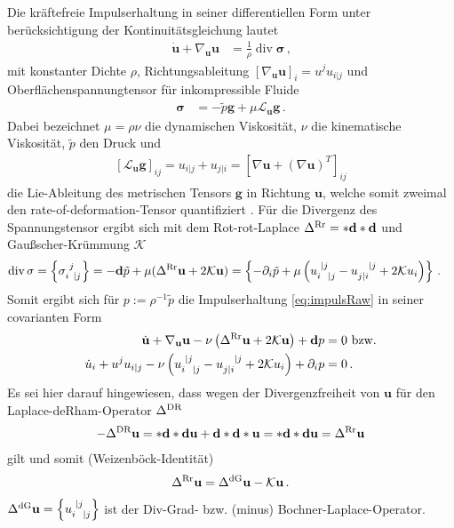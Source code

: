\documentclass[a4paper,11pt]{scrartcl}
\newcommand{\U}{u} %
\newcommand{\Ub}{\mathbf{\U}} %
\renewcommand{\P}{p} %
\newcommand{\g}{\mathbf{g}} %
\newcommand{\gauss}{\mathcal{K}} %
\renewcommand{\div}{\operatorname{div}} %
\newcommand{\lie}{\mathcal{L}} %
\newcommand{\exd}{\mathbf{d}} %
\newcommand{\lrr}{\Delta^{\textup{Rr}}} %
\newcommand{\ldg}{\Delta^{\textup{dG}}} %
\newcommand{\ldr}{\Delta^{\textup{DR}}} %
\newcommand{\formComma}{\,\text{,}}
\newcommand{\formPeriod}{\,\text{.}}
\begin{document}
Die kräftefreie Impulserhaltung in seiner differentiellen Form unter berücksichtigung der Kontinuitätsgleichung lautet \cite{deSimone2009}
\begin{align}\label{eq:impulsRaw}
   \dot{\Ub} + \nabla_{\Ub}\Ub &= \frac{1}{\rho}\div\mathbf{\sigma}\formComma
\end{align}
mit konstanter Dichte \( \rho \), Richtungsableitung \( \left[ \nabla_{\Ub}\Ub \right]_{i} = \U^{j}\U_{i|j} \)
und Oberflächenspannungtensor für inkompressible Fluide
\begin{align}
  \mathbf{\sigma} &= -\tilde{\P}\g + \mu\lie_{\Ub}\g\formPeriod
\end{align}
Dabei bezeichnet \( \mu = \rho\nu \) die dynamischen Viskosität, \( \nu \) die kinematische Viskosität,
\( \tilde{\P} \) den Druck und 
\begin{align}
  \left[ \lie_{\Ub}\g \right]_{ij} = \U_{i|j} + \U_{j|i} = \left[ \nabla\Ub + (\nabla\Ub)^{T} \right]_{ij}
\end{align}
die Lie-Ableitung des metrischen Tensors \( \g \) in Richtung \( \Ub \), welche somit zweimal den rate-of-deformation-Tensor quantifiziert \cite{marsden1983}.
Für die Divergenz des Spannungstensor \cite{deSimone2009} ergibt sich mit dem Rot-rot-Laplace \( \lrr = *\exd*\exd \) und Gaußscher-Krümmung \( \gauss \)
\begin{align}
  \div\mathbf{\sigma} &= \left\{ \tensor{\sigma}{_{i}^{j}_{|j}} \right\}
            = -\exd\tilde{\P} + \mu(\lrr\Ub + 2\gauss\Ub)
            = \left\{ -\partial_{i}\tilde{\P} + \mu\left( \tensor{\U}{_{i}^{|j}_{|j}} - \tensor{\U}{_{j|i}^{|j}} + 2\gauss\U_{i} \right) \right\} \formPeriod
\end{align}
Somit ergibt sich für \( \P := \rho^{-1}\tilde{\P} \) die Impulserhaltung \eqref{eq:impulsRaw} in seiner covarianten Form
\begin{align}
  \dot{\Ub} + \nabla_{\Ub}\Ub   - \nu\left( \lrr\Ub + 2\gauss\Ub \right) + \exd\P&= 0 \text{ bzw.} \label{eq:impuls}\\
  \dot{\U}_{i} + \U^{j}\U_{i|j} - \nu \left( \tensor{\U}{_{i}^{|j}_{|j}} - \tensor{\U}{_{j|i}^{|j}} + 2\gauss\U_{i}\right) + \partial_{i}\P &= 0 \formPeriod
\end{align}
Es sei hier darauf hingewiesen, dass wegen der Divergenzfreiheit von \( \Ub \) für den Laplace-deRham-Operator \( \ldr \)
\begin{align}
  -\ldr\Ub = *\exd*\exd\Ub + \exd*\exd*\Ub = *\exd*\exd\Ub = \lrr\Ub
\end{align}
gilt \cite{marsden1988} und somit (Weizenböck-Identität)
\begin{align}\label{eq:divfreeweizen}
  \lrr\Ub = \ldg\Ub - \gauss\Ub \formPeriod
\end{align}
\( \ldg\Ub = \left\{ \tensor{\U}{_{i}^{|j}_{|j}} \right\} \) ist der Div-Grad- bzw. (minus) Bochner-Laplace-Operator.
\end{document}
